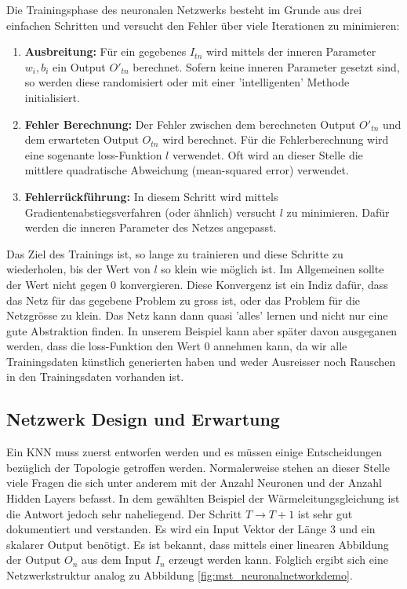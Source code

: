 Die Trainingsphase des neuronalen Netzwerks besteht im Grunde aus drei einfachen Schritten und versucht den Fehler über viele Iterationen zu minimieren:
\begin{enumerate}
	\item {\textbf{Ausbreitung:} Für ein gegebenes $I_{tn}$ wird mittels der inneren Parameter $w_{i}, b_{i}$ ein Output $O'_{tn}$ berechnet. Sofern keine inneren Parameter gesetzt sind, so werden diese randomisiert oder mit einer 'intelligenten' Methode initialisiert.}
	\item {\textbf{Fehler Berechnung:} Der Fehler zwischen dem berechneten Output $O'_{tn}$ und dem erwarteten Output $O_{tn}$ wird berechnet. Für die Fehlerberechnung wird eine sogenante loss-Funktion $l$ verwendet. Oft wird an dieser Stelle die mittlere quadratische Abweichung (mean-squared error) verwendet.}
	\item{\textbf{ Fehlerrückführung:} In diesem Schritt wird mittels Gradientenabstiegsverfahren (oder ähnlich) versucht $l$ zu minimieren. Dafür werden die inneren Parameter des Netzes angepasst.}
\end{enumerate}
Das Ziel des Trainings ist, so lange zu trainieren und diese Schritte zu wiederholen, bis der Wert von $l$ so klein wie möglich ist. 
Im Allgemeinen sollte der Wert nicht gegen 0 konvergieren. Diese Konvergenz ist ein Indiz dafür, dass das Netz für das gegebene Problem zu gross ist, oder das Problem für die Netzgrösse zu klein. Das Netz kann dann quasi 'alles' lernen und nicht nur eine gute Abstraktion finden.
In unserem Beispiel kann aber später davon ausgeganen werden, dass die loss-Funktion den Wert 0 annehmen kann, da wir alle Trainingsdaten künstlich generierten haben und weder Ausreisser noch Rauschen in den Trainingsdaten vorhanden ist.

\subsection{Netzwerk Design und Erwartung}
Ein KNN muss zuerst entworfen werden und es müssen einige Entscheidungen bezüglich der Topologie getroffen werden. Normalerweise stehen an dieser Stelle viele Fragen die sich unter anderem mit der Anzahl Neuronen und der Anzahl Hidden Layers befasst. In dem gewählten Beispiel der Wärmeleitungsgleichung ist die Antwort jedoch sehr naheliegend. Der Schritt $T \rightarrow T+1$ ist sehr gut dokumentiert und verstanden. Es wird ein Input Vektor der Länge 3 und ein skalarer Output benötigt. Es ist bekannt, dass mittels einer linearen Abbildung der Output $O_n$ aus dem Input $I_n$ erzeugt werden kann. Folglich ergibt sich eine Netzwerkstruktur analog zu Abbildung \ref{fig:mst_neuronalnetworkdemo}.

